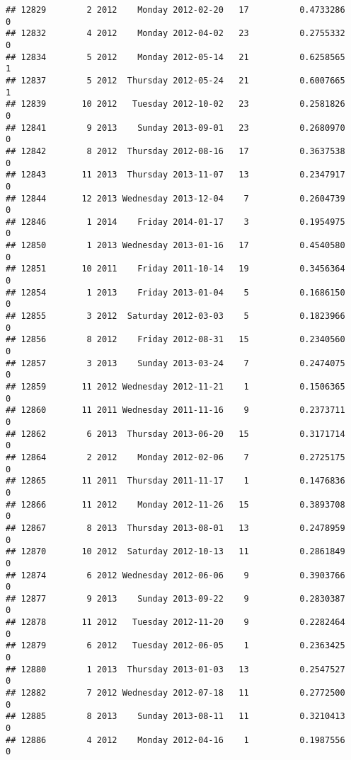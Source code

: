 \documentclass[
]{article}
\begin{document}
\begin{verbatim}
## 12829        2 2012    Monday 2012-02-20   17          0.4733286             0
## 12832        4 2012    Monday 2012-04-02   23          0.2755332             0
## 12834        5 2012    Monday 2012-05-14   21          0.6258565             1
## 12837        5 2012  Thursday 2012-05-24   21          0.6007665             1
## 12839       10 2012   Tuesday 2012-10-02   23          0.2581826             0
## 12841        9 2013    Sunday 2013-09-01   23          0.2680970             0
## 12842        8 2012  Thursday 2012-08-16   17          0.3637538             0
## 12843       11 2013  Thursday 2013-11-07   13          0.2347917             0
## 12844       12 2013 Wednesday 2013-12-04    7          0.2604739             0
## 12846        1 2014    Friday 2014-01-17    3          0.1954975             0
## 12850        1 2013 Wednesday 2013-01-16   17          0.4540580             0
## 12851       10 2011    Friday 2011-10-14   19          0.3456364             0
## 12854        1 2013    Friday 2013-01-04    5          0.1686150             0
## 12855        3 2012  Saturday 2012-03-03    5          0.1823966             0
## 12856        8 2012    Friday 2012-08-31   15          0.2340560             0
## 12857        3 2013    Sunday 2013-03-24    7          0.2474075             0
## 12859       11 2012 Wednesday 2012-11-21    1          0.1506365             0
## 12860       11 2011 Wednesday 2011-11-16    9          0.2373711             0
## 12862        6 2013  Thursday 2013-06-20   15          0.3171714             0
## 12864        2 2012    Monday 2012-02-06    7          0.2725175             0
## 12865       11 2011  Thursday 2011-11-17    1          0.1476836             0
## 12866       11 2012    Monday 2012-11-26   15          0.3893708             0
## 12867        8 2013  Thursday 2013-08-01   13          0.2478959             0
## 12870       10 2012  Saturday 2012-10-13   11          0.2861849             0
## 12874        6 2012 Wednesday 2012-06-06    9          0.3903766             0
## 12877        9 2013    Sunday 2013-09-22    9          0.2830387             0
## 12878       11 2012   Tuesday 2012-11-20    9          0.2282464             0
## 12879        6 2012   Tuesday 2012-06-05    1          0.2363425             0
## 12880        1 2013  Thursday 2013-01-03   13          0.2547527             0
## 12882        7 2012 Wednesday 2012-07-18   11          0.2772500             0
## 12885        8 2013    Sunday 2013-08-11   11          0.3210413             0
## 12886        4 2012    Monday 2012-04-16    1          0.1987556             0

\end{verbatim}
\end{document}
